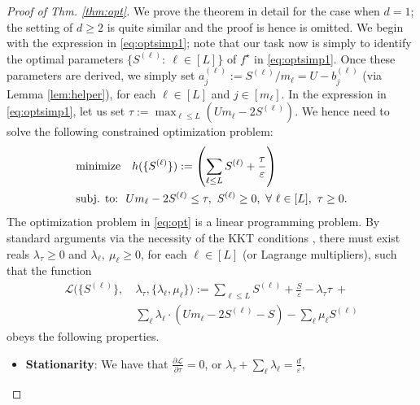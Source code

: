 \documentclass[conference,letterpaper]{IEEEtran}
\theoremstyle{remark}
\theoremstyle{definition}
\begin{document}
\begin{proof}[Proof of Thm. \ref{thm:opt}]
	We prove the theorem in detail for the case when $d=1$; the setting of $d\geq 2$ is quite similar and the proof is hence is omitted. We begin with the expression in \eqref{eq:optsimp1}; note that our task now is simply to identify the optimal parameters $\{S^{(\ell)}:\ \ell\in [L]\}$ of $f^\star$ in \eqref{eq:optsimp1}. Once these parameters are derived, we simply set $a_j^{(\ell)}:= S^{(\ell)}/m_\ell = U-b_j^{(\ell)}$ (via Lemma \ref{lem:helper}), for each $\ell\in [L]$ and $j\in [m_\ell]$. In the expression in \eqref{eq:optsimp1}, let us set $\tau:= \max_{\ell\leq L} \left(Um_\ell - 2S^{(\ell)}\right)$. We hence need to solve the following constrained optimization problem:
	\begin{align}
		&{\text{minimize}}\quad h(\{S^{(\ell)}\}):= \left(\sum_{\ell\leq L} S^{(\ell)}+\frac{\tau}{\varepsilon}\right)\notag\\
		&\text{subj. to:}\ \  Um_\ell-2S^{(\ell)}\leq \tau,\ S^{(\ell)}\geq 0,\ \forall\ \ell\in [L],\ \tau\geq 0.\label{eq:opt}
	\end{align}
The optimization problem in \eqref{eq:opt} is a linear programming problem. By standard arguments via the necessity of the KKT conditions \cite[Sec. 5.5.3]{boyd}, there must exist reals $\lambda_\tau\geq 0$ and $\lambda_\ell,\ \mu_\ell\geq 0$, for each $\ell\in [L]$ (or Lagrange multipliers), such that the function 
\begin{align*}
\mathcal{L}(\{S^{(\ell)}\},\ &\lambda_\tau,\{\lambda_\ell,\mu_\ell\}):= \sum_{\ell\leq L} S^{(\ell)}+\frac{S}{\varepsilon}-\lambda_\tau \tau\ + \\
&\sum_\ell \lambda_\ell\cdot \left(Um_\ell-2S^{(\ell)}-S\right)-\sum_\ell \mu_\ell S^{(\ell)}
\end{align*}
obeys the following properties.
\begin{itemize}
	\item \textbf{Stationarity}: We have that $\frac{\partial \mathcal{L}}{\partial \tau} = 0$, or $\lambda_\tau+\sum_\ell \lambda_\ell = \frac{d}{\varepsilon},$

\end{itemize}
\end{proof}
\end{document}
